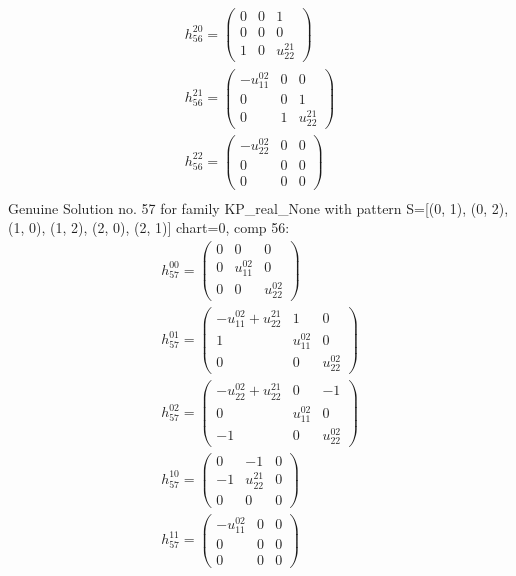 \documentclass[a4paper, 11pt, twoside, onecolumn]{article}
\begin{document}
\begin{landscape}
\begin{gather*}
	 h_{56}^{20}=\begin{pmatrix}0 & 0 & 1\\0 & 0 & 0\\1 & 0 & u^{21}_{22}\end{pmatrix}\\ 
	 h_{56}^{21}=\begin{pmatrix}- u^{02}_{11} & 0 & 0\\0 & 0 & 1\\0 & 1 & u^{21}_{22}\end{pmatrix}\\ 
	 h_{56}^{22}=\begin{pmatrix}- u^{02}_{22} & 0 & 0\\0 & 0 & 0\\0 & 0 & 0\end{pmatrix}\\ 
\end{gather*} 
Genuine Solution no. 57 for family KP_real_None with pattern S=[(0, 1), (0, 2), (1, 0), (1, 2), (2, 0), (2, 1)] chart=0, comp 56: 
\begin{gather*} 
	 h_{57}^{00}=\begin{pmatrix}0 & 0 & 0\\0 & u^{02}_{11} & 0\\0 & 0 & u^{02}_{22}\end{pmatrix}\\ 
	 h_{57}^{01}=\begin{pmatrix}- u^{02}_{11} + u^{21}_{22} & 1 & 0\\1 & u^{02}_{11} & 0\\0 & 0 & u^{02}_{22}\end{pmatrix}\\ 
	 h_{57}^{02}=\begin{pmatrix}- u^{02}_{22} + u^{21}_{22} & 0 & -1\\0 & u^{02}_{11} & 0\\-1 & 0 & u^{02}_{22}\end{pmatrix}\\ 
	 h_{57}^{10}=\begin{pmatrix}0 & -1 & 0\\-1 & u^{21}_{22} & 0\\0 & 0 & 0\end{pmatrix}\\ 
	 h_{57}^{11}=\begin{pmatrix}- u^{02}_{11} & 0 & 0\\0 & 0 & 0\\0 & 0 & 0\end{pmatrix}\\ 

\end{gather*}
\end{landscape}
\end{document}
